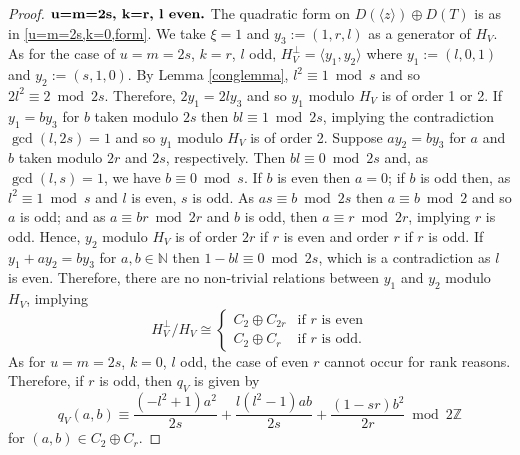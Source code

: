 \documentclass[12pt, a4paper]{article}
\newcommand{\ZZ}{\mathbb{Z}}
\newcommand{\NN}{\mathbb{N}}
\newcommand{\la}{\langle}
\newcommand{\ra}{\rangle}
\newcommand{\opn}{\operatorname}
\newcommand{\op}{\oplus}
\begin{document}
\begin{proof}
  \sloppy
  \noindent  $\textbf{u=m=2s, k=r, l \text{even}.}$ 
  The quadratic form on $D(\la z \ra) \op D(T)$ is as in  \eqref{u=m=2s,k=0,form}.
  We take $\xi=1$ and $y_3 := (1,r,l)$ as a generator of $H_V$.
  As for the case of $u=m=2s$, $k=r$, $l$ odd, $H_V^{\perp} = \la y_1, y_2 \ra$ where $y_1:=(l,0,1)$ and $y_2:=(s,1,0)$.
  By Lemma \ref{conglemma}, $l^2 \equiv 1 \bmod{ s}$ and so $2l^2 \equiv 2 \bmod{ 2s}$.
  Therefore, $2y_1 = 2l y_3$ and so $y_1$ modulo $H_V$ is of order 1 or 2. 
  If $y_1 = b y_3$ for $b$ taken modulo $2s$ then $bl \equiv 1 \bmod{ 2s}$, implying the contradiction $\opn{gcd}(l, 2s)=1$ and so $y_1$ modulo $H_V$ is of order 2. 
  Suppose $a y_2 = b y_3$ for $a$ and $b$ taken modulo $2r$ and  $2s$, respectively.
  Then $bl \equiv 0 \bmod{ 2s}$ and, as $\opn{gcd}(l, s)=1$, we have $b \equiv 0 \bmod{ s}$.
  If $b$ is even then $a=0$; 
  if $b$ is odd then, as $l^2 \equiv 1 \bmod{ s}$ and $l$ is even, $s$ is odd.
  As $as \equiv b \bmod{ 2s}$ then $a \equiv b \bmod{ 2}$ and so $a$ is odd;
  and as $a \equiv br \bmod{ 2r}$ and $b$ is odd, then $a \equiv r \bmod{ 2r}$, implying $r$ is odd.
  Hence, $y_2$ modulo $H_V$ is of order $2r$ if $r$ is even and order $r$ if $r$ is odd.
  If $y_1 + a y_2 = b y_3$ for $a,b \in \NN$ then $1-bl \equiv 0 \bmod{ 2s}$, which is a contradiction as $l$ is even.
  Therefore, there are no non-trivial relations between $y_1$ and $y_2$ modulo $H_V$, implying 
  \begin{equation*}
    H_V^{\perp}/H_V \cong
    \begin{cases}
      C_2 \op C_{2r} & \text{if $r$ is even} \\
      C_2 \op C_r & \text{if $r$ is odd.}
    \end{cases}
    \end{equation*}
  As for $u=m=2s$, $k=0$, $l$ odd, the case of even $r$ cannot occur for rank reasons.
  Therefore, if $r$ is odd, then  $q_V$ is given by
\[
  q_V(a,b) \equiv
  \frac{(-l^2 + 1)a^2}{2s}
  +
  \frac{l(l^2 - 1)ab}{2s}
  +
  \frac{(1-sr)b^2}{2r} \bmod{ 2 \ZZ}
  \]
  for $(a,b) \in C_2 \op C_r$.
\end{proof}
\end{document}
